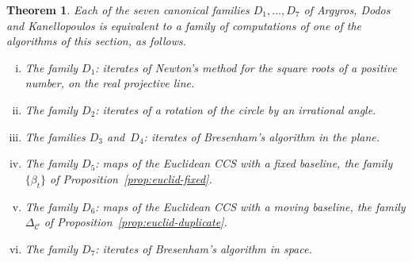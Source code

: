 \documentclass[psamsfonts]{amsart}
\newtheorem{thm}{Theorem}[section]
\theoremstyle{definition}
\theoremstyle{remark}
\numberwithin{equation}{section}
\begin{document}
\begin{thm}\label{thm:hepta-realized}
  Each of the seven canonical families $D_1,\dots,D_7$ of Argyros, Dodos and Kanellopoulos is equivalent to a family of computations of one of the algorithms of this section, as follows.
  \begin{enumerate}[(i)]
  \item The family $D_1$: iterates of Newton's method for the square roots of a positive number, on the real projective line.
  \item The family $D_2$: iterates of a rotation of the circle by an irrational angle.
  \item The families $D_3$ and~$D_4$: iterates of Bresenham's algorithm in the plane.
  \item The family $D_5$: maps of the Euclidean CCS with a fixed baseline, the family $\{\beta_t\}$ of Proposition~\ref{prop:euclid-fixed}.
  \item The family $D_6$: maps of the Euclidean CCS with a moving baseline, the family $\Delta_{\mathcal{C}}$ of Proposition~\ref{prop:euclid-duplicate}.
  \item The family $D_7$: iterates of Bresenham's algorithm in space.
  \end{enumerate}
\end{thm}
\end{document}
